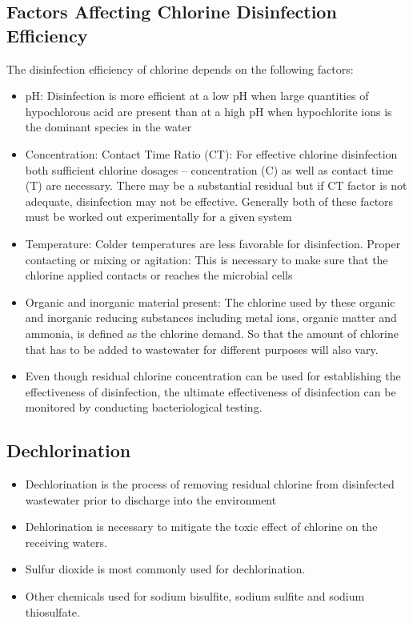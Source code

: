 \subsection{Factors Affecting Chlorine Disinfection Efficiency}

The disinfection efficiency of chlorine depends on the following factors:\\
\begin{itemize}
	\item pH:  Disinfection is more efficient at a low pH when large quantities of hypochlorous acid are present than at a high pH when hypochlorite ions is the dominant species in the water
	\item Concentration:  Contact Time Ratio (CT):  For effective chlorine disinfection both sufficient chlorine dosages – concentration (C) as well as contact time (T) are necessary.  There may be a substantial residual but if CT factor is not adequate, disinfection may not be effective. Generally both of these factors must be worked out experimentally for a given system
	\item Temperature:  Colder temperatures are less favorable for disinfection. 
Proper contacting or mixing or agitation:  This is necessary to make sure that the chlorine applied contacts or reaches the microbial cells
	\item Organic and inorganic material present:  The chlorine used by these organic and inorganic reducing substances including metal ions, organic matter and ammonia, is defined as the chlorine demand.  So that the amount of chlorine that has to be added to wastewater for different purposes will also vary.
\item Even though residual chlorine concentration can be used for establishing the effectiveness of disinfection, the ultimate effectiveness of disinfection can be monitored by conducting bacteriological testing.
\end{itemize}
		
\subsection{Dechlorination}
\begin{itemize}
\item Dechlorination is the process of removing residual chlorine from disinfected wastewater prior to discharge into the environment
\item Dehlorination is necessary to mitigate the toxic effect of chlorine on the receiving waters.  
\item Sulfur dioxide is most commonly used for dechlorination.
\item Other chemicals used for sodium bisulfite, sodium sulfite and sodium thiosulfate.
\end{itemize}

